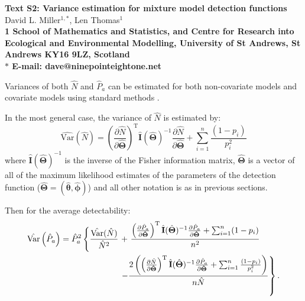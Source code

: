 \documentclass[10pt]{article}
\date{}
\begin{document}
\begin{flushleft}
{\Large
\textbf{Text S2: Variance estimation for mixture model detection functions}
}
\\
David L. Miller$^{1,\ast}$,
Len Thomas$^{1}$
\\
\bf{1} School of Mathematics and Statistics, and Centre for Research into Ecological and Environmental Modelling, University of St Andrews, St Andrews KY16 9LZ, Scotland
\\
$\ast$ E-mail: dave@ninepointeightone.net
\end{flushleft}


Variances of both $\hat{N}$ and $\hat{P}_a$ can be estimated for both non-covariate models and covariate models using standard methods \cite{Borchers:2002vc, Marques:2003vb,Borchers:1998uwa}.

In the most general case, the variance of $\hat{N}$ is estimated by:
\begin{equation*}
\hat{\text{Var}}\left( \hat{N} \right) = \left(\frac{\partial \hat{N}}{\partial\hat{\mathbf{\Theta}}}\right)^\text{T}\hat{\mathbf{I}}(\hat{\mathbf{\Theta}})^{-1}\frac{\partial \hat{N}}{\partial\hat{\mathbf{\Theta}}} + \sum_{i=1}^n \frac{(1-p_i)}{p_i^2}
\end{equation*}
where $\hat{\mathbf{I}}(\hat{\mathbf{\Theta}})^{-1}$ is the inverse of the Fisher information matrix,  $\hat{\mathbf{\Theta}}$ is a vector of all of the maximum likelihood estimates of the parameters of the detection function ($\hat{\mathbf{\Theta}}=(\hat{\boldsymbol{\theta}},\hat{\boldsymbol{\phi}})$) and all other notation is as in previous sections.

Then for the average detectability:
\begin{align*}
\hat{\text{Var}}\left( \hat{P}_a \right) = \hat{P}_a^2\left\{ \vphantom{\frac{\frac{a}{b}^b}{b}} \frac{\hat{\text{Var}}(\hat{N})}{\hat{N}^2}\right. &+\left.\frac{\left(\frac{\partial \hat{P}_a}{\partial\mathbf{\hat{\Theta}}}\right)^\text{T}\hat{\mathbf{I}}(\hat{\mathbf{\Theta}})^{-1}\frac{\partial \hat{P}_a}{\partial\mathbf{\hat{\Theta}}}+\sum_{i=1}^n (1-p_i)}{n^2} \right. \\
 & \left. - \frac{2\left(\left(\frac{\partial \hat{N}}{\partial\mathbf{\hat{\Theta}}}\right)^\text{T}\hat{\mathbf{I}}(\hat{\mathbf{\Theta}})^{-1}\frac{\partial \hat{P}_a}{\partial\mathbf{\hat{\Theta}}}+\sum_{i=1}^n\frac{(1-p_i)}{p_i^2}\right)}{n\hat{N}}\right\}.\\
\end{align*}



\end{document}
